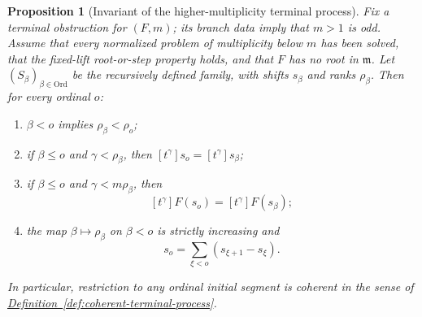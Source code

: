 \documentclass[11pt]{article}
\newcommand{\namedref}[2]{\hyperref[#2]{#1~\ref*{#2}}}
\theoremstyle{proofnote}
\newtheorem{proposition}[theorem]{Proposition}
\begin{document}
\begin{proposition}[Invariant of the higher-multiplicity terminal process]
\label{prop:terminal-process-invariant}
  Fix a terminal obstruction for \((F,m)\); its branch data imply that
  \(m>1\) is odd.  Assume that every normalized problem of multiplicity
  below \(m\) has been solved, that the fixed-lift root-or-step property
  holds, and that \(F\) has no root in \(\mathfrak m\).  Let
  \((S_\beta)_{\beta\in\mathrm{Ord}}\) be the recursively defined family,
  with shifts \(s_\beta\) and ranks \(\rho_\beta\).  Then for every ordinal
  \(o\):
  \begin{enumerate}[label=(\roman*)]
    \item \(\beta<o\) implies \(\rho_\beta<\rho_o\);
    \item if \(\beta\le o\) and \(\gamma<\rho_\beta\), then
      \([t^\gamma]s_o=[t^\gamma]s_\beta\);
    \item if \(\beta\le o\) and \(\gamma<m\rho_\beta\), then
      \[
        [t^\gamma]F(s_o)=[t^\gamma]F(s_\beta);
        \tag{EC}\label{eq:terminal-eval-coherence}
      \]
    \item the map \(\beta\mapsto\rho_\beta\) on \(\beta<o\) is strictly
      increasing and
      \[
        s_o=\sum_{\xi<o}(s_{\xi+1}-s_\xi).
        \tag{HS}\label{eq:terminal-prefix-sum}
      \]
  \end{enumerate}
  In particular, restriction to any ordinal initial segment is coherent in
  the sense of \namedref{Definition}{def:coherent-terminal-process}.
\end{proposition}
\end{document}
